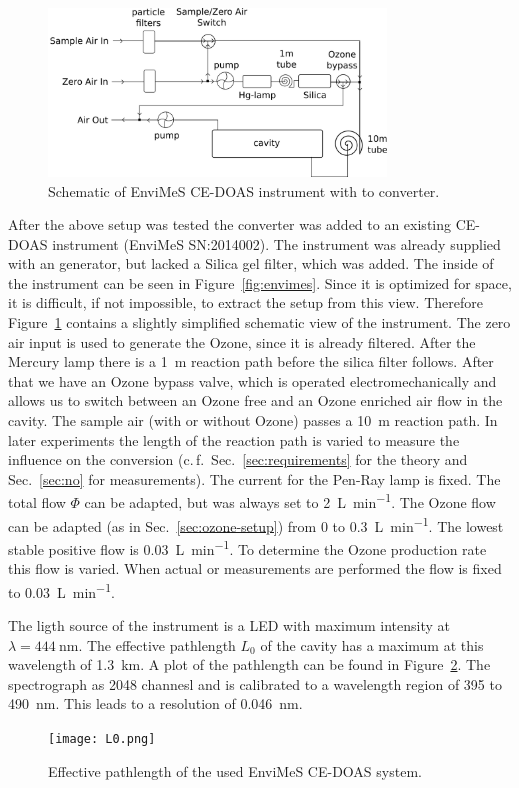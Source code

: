 \begin{figure}[htbp]
  \centering
  \includegraphics[width=0.8\textwidth]{images/envimes_setup.png}
  \caption{Schematic of EnviMeS CE-DOAS instrument with  to
     converter.}
  \label{fig:envimes-schematic}
\end{figure}

After the above setup was tested the converter was added to an
existing CE-DOAS instrument (EnviMeS SN:2014002).  The instrument was
already supplied with an  generator, but lacked a Silica gel
filter, which was added. The inside of the instrument can be seen in
Figure~\ref{fig:envimes}. Since it is optimized for space, it is
difficult, if not impossible, to extract the setup from this
view. Therefore Figure~\ref{fig:envimes-schematic} contains a slightly
simplified schematic view of the instrument. The zero air input is
used to generate the Ozone, since it is already filtered. After the
Mercury lamp there is a \SI{1}{\meter} reaction path before the silica
filter follows. After that we have an Ozone bypass valve, which is
operated electromechanically and allows us to switch between an Ozone
free and an Ozone enriched air flow in the cavity. The sample air
(with or without Ozone) passes a \SI{10}{\meter} reaction path. In
later experiments the length of the reaction path is varied to measure
the influence on the  conversion (c.\,f.\
Sec.~\ref{sec:requirements} for the theory and Sec.~\ref{sec:no} for
measurements). The current for the Pen-Ray lamp is fixed. The total
flow $\Phi$ can be adapted, but was always set to
\SI{2}{\liter\per\minute}. The Ozone flow can be adapted (as in
Sec.~\ref{sec:ozone-setup}) from 0 to \SI{0.3}{\liter\per\minute}. The
lowest stable positive flow is \SI{0.03}{\liter\per\minute}. To
determine the Ozone production rate this flow is varied. When actual
\ch{NO} or \ch{NO_x} measurements are
performed the flow is fixed to \SI{0.03}{\liter\per\minute}.

The ligth source of the instrument is a LED with maximum intensity at
$\lambda = \SI{444}{\nano\meter}$. The effective pathlength $L_0$ of
the cavity has a maximum at this wavelength of
\SI{1.3}{\kilo\meter}. A plot of the pathlength can be found in
Figure~\ref{fig:pathlength}. The spectrograph as \num{2048} channesl
and is calibrated to a wavelength region of \num{395} to
\SI{490}{\nano\meter}. This leads to a resolution of
\SI{0.046}{\nano\meter}.

\begin{figure}[htbp]
  \centering
  \texttt{[image: L0.png]}
  \caption{Effective pathlength of the used EnviMeS CE-DOAS system.}
  \label{fig:pathlength}
\end{figure}


